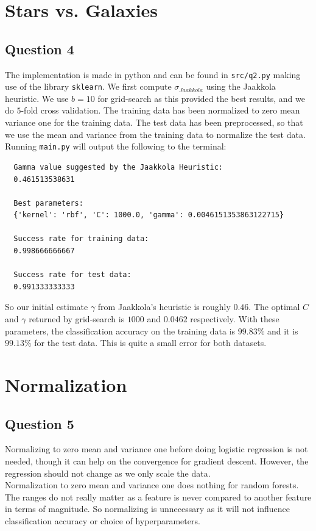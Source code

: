 \documentclass[a4paper]{article}
\begin{document}
\section{Stars vs. Galaxies}
\subsection{Question 4}
The implementation is made in python and can be found in \texttt{src/q2.py} making use of the library \texttt{sklearn}. We first compute $\sigma_{Jaakkola}$ using the Jaakkola heuristic. We use $b=10$ for grid-search as this provided the best results, and we do $5$-fold cross validation. The training data has been normalized to zero mean variance one for the training data. The test data has been preprocessed, so that we use the mean and variance from the training data to normalize the test data. Running \texttt{main.py} will output the following to the terminal:
\begin{verbatim}
  Gamma value suggested by the Jaakkola Heuristic:
  0.461513538631

  Best parameters:
  {'kernel': 'rbf', 'C': 1000.0, 'gamma': 0.0046151353863122715}

  Success rate for training data:
  0.998666666667

  Success rate for test data:
  0.991333333333
\end{verbatim}
So our initial estimate $\gamma$ from Jaakkola's heuristic is roughly $0.46$. The optimal $C$ and $\gamma$ returned by grid-search is $1000$ and $0.0462$ respectively. With these parameters, the classification accuracy on the training data is $99.83\%$ and it is $99.13\%$ for the test data. This is quite a small error for both datasets.

\section{Normalization}
\subsection{Question 5}
Normalizing to zero mean and variance one before doing logistic regression is not needed, though it can help on the convergence for gradient descent. However, the regression should not change as we only scale the data. \\
Normalization to zero mean and variance one does nothing for random forests. The ranges do not really matter as a feature is never compared to another feature in terms of magnitude. So normalizing is unnecessary as it will not influence classification accuracy or choice of hyperparameters.
\end{document}
